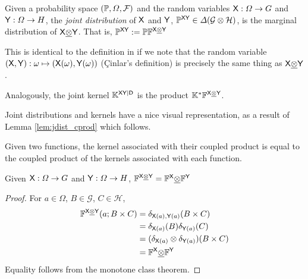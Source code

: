 \begin{definition}\label{def:joint_distribution}
Given a probability space $(\mathbb{P},\Omega,\mathcal{F})$ and the random variables $\mathsf{X}:\Omega\to G$ and $\mathsf{Y}:\Omega\to H$, the \emph{joint distribution} of $\mathsf{X}$ and $\mathsf{Y}$, $\mathbb{P}^{\mathsf{X}\mathsf{Y}}\in \Delta(\mathcal{G}\otimes\mathcal{H})$, is the marginal distribution of $\mathsf{X}\underline{\otimes}\mathsf{Y}$. That is, $\mathbb{P}^{\mathsf{X}\mathsf{Y}}:=\mathbb{P} \mathbb{F}^{\mathsf{X}\underline{\otimes}\mathsf{Y}}$

This is identical to the definition in \citet{cinlar_probability_2011} if we note that the random variable $(\mathsf{X},\mathsf{Y}):\omega\mapsto (\mathsf{X}(\omega),\mathsf{Y}(\omega))$ (\c{C}inlar's definition) is precisely the same thing as $\mathsf{X}\underline{\otimes}\mathsf{Y}$.

Analogously, the joint kernel $\mathbb{K}^{\mathsf{X}\mathsf{Y}|\mathsf{D}}$ is the product $\mathbb{K}^*\mathbb{F}^{\mathsf{X}\underline{\otimes}\mathsf{Y}}$.
\end{definition}

Joint distributions and kernels have a nice visual representation, as a result of Lemma \ref{lem:jdist_cprod} which follows.

\begin{lemma}\label{lem:jdist_cprod}
Given two functions, the kernel associated with their coupled product is equal to the coupled product of the kernels associated with each function.

Given $\mathsf{X}:\Omega\to G$ and $\mathsf{Y}:\Omega\to H$, $\mathbb{F}^{\mathsf{X}\underline{\otimes}\mathsf{Y}}=\mathbb{F}^{\mathsf{X}}\underline{\otimes}\mathbb{F}^{\mathsf{Y}}$
\end{lemma}

\begin{proof}
For $a\in \Omega$, $B\in \mathcal{G}$, $C\in \mathcal{H}$,
\begin{align}
\mathbb{F}^{\mathsf{X}\underline{\otimes}\mathsf{Y}} (a;B\times C) &= \delta_{\mathsf{X}(a),\mathsf{Y}(a)}(B\times C)\\
									   &= \delta_{\mathsf{X}(a)}(B)\delta_{\mathsf{Y}(a)}(C)\\
									   &= (\delta_{\mathsf{X}(a)}\otimes\delta_{\mathsf{Y}(a)})(B\times C)\\
									   &= \mathbb{F}^{\mathsf{X}}\underline{\otimes}\mathbb{F}^{\mathsf{Y}}
\end{align}
Equality follows from the monotone class theorem.
\end{proof}

